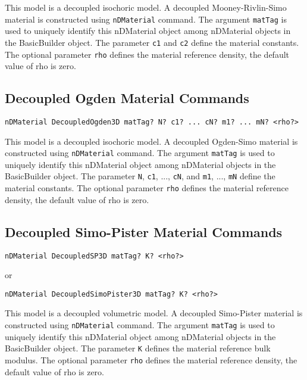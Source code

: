 This model is a decoupled isochoric model. 
A decoupled Mooney-Rivlin-Simo material is constructed using \texttt{nDMaterial} command.
The argument \texttt{matTag} is used to uniquely identify this nDMaterial object among 
nDMaterial objects in the BasicBuilder object. The parameter \texttt{c1} and \texttt{c2}
define the material constants.  
The optional parameter \texttt{rho} defines the material reference density, 
the default value of rho is zero. 


\subsection{Decoupled Ogden Material Commands}
\label{DO}

\begin{verbatim}
nDMaterial DecoupledOgden3D matTag? N? c1? ... cN? m1? ... mN? <rho?> 
\end{verbatim}

This model is a decoupled isochoric model. 
A decoupled Ogden-Simo material is constructed using \texttt{nDMaterial} command.
The argument \texttt{matTag} is used to uniquely identify this nDMaterial object among 
nDMaterial objects in the BasicBuilder object. The parameter \texttt{N},  
\texttt{c1}, ..., \texttt{cN}, and \texttt{m1}, ..., \texttt{mN} define the material constants. 
The optional parameter \texttt{rho} defines the material reference density, 
the default value of rho is zero. 


\subsection{Decoupled Simo-Pister Material Commands}
\label{DSP}

\begin{verbatim}
nDMaterial DecoupledSP3D matTag? K? <rho?> 
\end{verbatim}
or
\begin{verbatim}
nDMaterial DecoupledSimoPister3D matTag? K? <rho?> 
\end{verbatim}


This model is a decoupled volumetric model. 
A decoupled Simo-Pister material is constructed using \texttt{nDMaterial} command.
The argument \texttt{matTag} is used to uniquely identify this nDMaterial object among 
nDMaterial objects in the BasicBuilder object.
The parameter \texttt{K} defines the material reference bulk modulus.   
The optional parameter \texttt{rho} defines the material reference density, 
the default value of rho is zero. 

